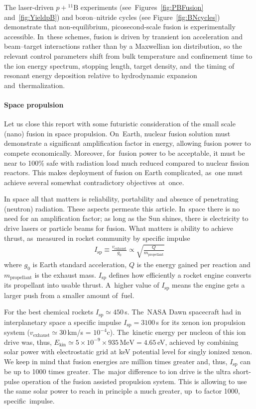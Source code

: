 \documentclass[particles,article,accept,pdftex,moreauthors]{Definitions/mdpi}
\begin{document}
The laser-driven $p+{}^{11}\mathrm{B}$ experiments (see~Figures~\ref{fig:PBFusion} and~\ref{fig:YieldpB}) and boron--nitride cycles (see Figure~\ref{fig:BNcycles}) demonstrate that non-equilibrium, picosecond-scale fusion is experimentally accessible. In~these schemes, fusion is driven by transient ion acceleration and beam--target interactions rather than by a Maxwellian ion distribution, so the relevant control parameters shift from bulk temperature and confinement time to the ion energy spectrum, stopping length, target density, and~the timing of resonant energy deposition relative to hydrodynamic expansion and~thermalization. 


\vspace{-6pt}\paragraph*{\bf Space propulsion}
Let us close this report with some futuristic consideration of the small scale (nano) fusion in space propulsion. On~Earth, nuclear fusion solution must demonstrate a significant amplification factor in energy, allowing fusion power to compete economically. Moreover, for~fusion power to be acceptable, it must be near to 100\% safe with radiation load much reduced compared to nuclear fission reactors. This makes deployment of fusion on Earth complicated, as~one must achieve several somewhat contradictory objectives at~once. 

In space all that matters is reliability, portability and absence of penetrating (neutron) radiation. These aspects permeate this article. In~space there is no need for an amplification factor; as long as the Sun shines, there is electricity to drive lasers or particle beams for fusion. What matters is ability to achieve thrust, as~measured in rocket community by specific impulse
\begin{align}
I_\mathrm{sp}\equiv\frac{v_\mathrm{exhaust}}{g_0} \propto \sqrt{\frac{Q}{m_\mathrm{propellant}}}
\end{align}
where $g_0$ is Earth standard acceleration, $Q$ is the energy gained per reaction and $m_\mathrm{propellant}$ is the exhaust mass. $I_\mathrm{sp}$ defines how efficiently a rocket engine converts its propellant into usable thrust. A~higher value of $I_\mathrm{sp}$ means the engine gets a larger push from a smaller amount of~fuel. 

For the best chemical rockets $I_\mathrm{sp}\simeq 450$\,s. The~NASA Dawn spacecraft had in interplanetary space a specific impulse $I_\mathrm{sp}=3100$\,s for its xenon ion propulsion system ($v_\mathrm{exhaust}\simeq 30$\,km/s = $10^{-4}$c). The~kinetic energy per nucleon of this ion drive was, thus, $E_\mathrm{kin}\simeq 5\times 10^{-9}\times935\,\mathrm{MeV}=4.65$\,eV, achieved by combining solar power with electrostatic grid at keV potential level for singly ionized xenon. We keep in mind that fusion energies are million times greater and, thus, $I_\mathrm{sp}$ can be up to 1000 times greater. The~major difference to ion drive is the ultra short-pulse operation of the fusion assisted propulsion system. This is allowing to use the same solar power to reach in principle a much greater, up~to factor 1000, specific~impulse.
\end{document}
